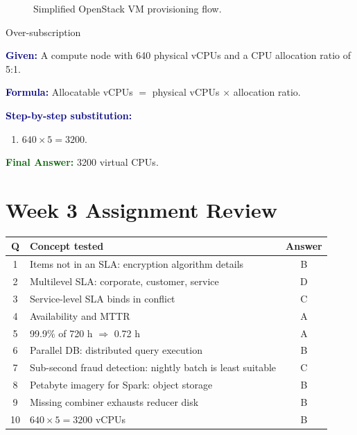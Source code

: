 \documentclass[11pt,a4paper,openany]{report}
\newcommand{\Given}{\par\textbf{\textcolor{navy}{Given:}} }
\newcommand{\Formula}{\par\textbf{\textcolor{navy}{Formula:}} }
\newcommand{\Steps}{\par\textbf{\textcolor{navy}{Step-by-step substitution:}}\par}
\newcommand{\Answer}{\par\textbf{\textcolor{darkgreen}{Final Answer:}} }
\begin{document}
\begin{figure}[H]
\centering
{}
\caption{Simplified OpenStack VM provisioning flow.}
\end{figure}

\begin{solved}{Over-subscription}
\Given A compute node with 640 physical vCPUs and a CPU allocation ratio of 5:1.
\Formula Allocatable vCPUs $=$ physical vCPUs $\times$ allocation ratio.
\Steps
\begin{enumerate}[leftmargin=*]
  \item $640 \times 5 = 3200$.
\end{enumerate}
\Answer 3200 virtual CPUs.
\end{solved}

\section{Week 3 Assignment Review}
\begin{center}
\begin{tabularx}{\textwidth}{cXc}
\toprule
Q & Concept tested & Answer\\
\midrule
1 & Items not in an SLA: encryption algorithm details & B\\
2 & Multilevel SLA: corporate, customer, service & D\\
3 & Service-level SLA binds in conflict & C\\
4 & Availability and MTTR & A\\
5 & 99.9\% of 720 h $\Rightarrow$ 0.72 h & A\\
6 & Parallel DB: distributed query execution & B\\
7 & Sub-second fraud detection: nightly batch is least suitable & C\\
8 & Petabyte imagery for Spark: object storage & B\\
9 & Missing combiner exhausts reducer disk & B\\
10 & $640 \times 5 = 3200$ vCPUs & B\\
\bottomrule
\end{tabularx}
\end{center}
\end{document}
